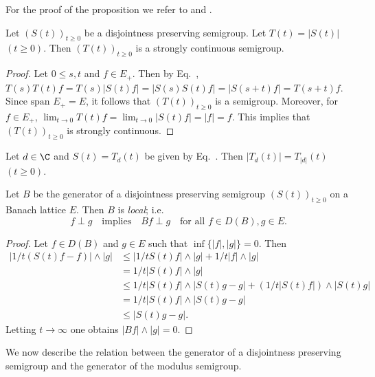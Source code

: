 For the proof of the proposition we refer to \textcite{arendt:1983} and \textcite{depagter:1984}.

\begin{proposition}\label{prop:c2-5.2}
Let $(S(t))_{t \geq 0}$ be a disjointness preserving semigroup. 
Let $T(t) = |S(t)|$ $(t \geq 0)$. 
Then $(T(t))_{t \geq 0}$ is a strongly continuous semigroup.
\end{proposition}

\begin{proof}
Let $0 \leq s,t$ and $f \in E_{+}$. 
Then by Eq.~, $T(s)T(t)f = T(s)|S(t)f| = |S(s)S(t)f| = |S(s+t)f| = T(s+t)f$. 
Since $\text{span } E_{+} = E$, it follows that $(T(t))_{t \geq 0}$ is a semigroup. 
Moreover, for $f \in E_{+}$, $\lim_{t \to 0} T(t)f = \lim_{t \to 0} |S(t)f| = |f| = f$. 
This implies that $(T(t))_{t \geq 0}$ is strongly continuous.
\end{proof}
\begin{example}\label{ex:c2-5.3}
Let $d \in \C$ and $S(t) = T_{d}(t)$ be given by Eq.~. 
Then $|T_{d}(t)| = T_{|d|}(t)$ $(t \geq 0)$.
\end{example}

\begin{proposition}\label{prop:c2-5.4}
Let $B$ be the generator of a disjointness preserving semigroup $(S(t))_{t \geq 0}$ on a Banach lattice $E$. 
Then $B$ is \emph{local}; i.e.
\begin{equation}\label{eq:c2-5.4}
f \perp g \quad \text{implies} \quad Bf \perp g \quad \text{for all } f \in D(B), g \in E.
\end{equation}
\end{proposition}

\begin{proof}
Let $f \in D(B)$ and $g \in E$ such that $\inf\{|f|,|g|\} = 0$. 
Then
\begin{align*}
|1/t(S(t)f - f)| \wedge |g| &\leq |1/tS(t)f| \wedge |g| + 1/t|f| \wedge |g|\\
&= 1/t |S(t)f| \wedge |g|\\
&\leq 1/t |S(t)f| \wedge |S(t)g -g| + (1/t|S(t)f|) \wedge |S(t)g|\\
&= 1/t |S(t)f| \wedge |S(t)g - g|\\
&\leq |S(t)g - g|.
\end{align*}
Letting $t \to \infty$ one obtains $|Bf| \wedge |g| = 0$.
\end{proof}

We now describe the relation between the generator of a disjointness preserving semigroup and the generator of the modulus semigroup.

